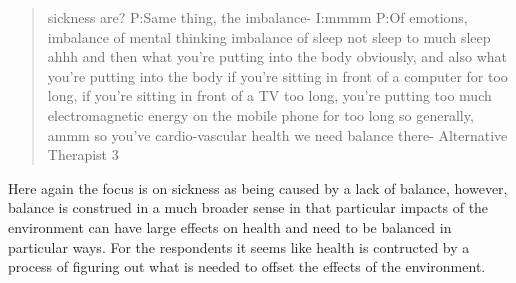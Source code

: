 \begin{quotation}
  sickness are?
P:Same thing, the imbalance-
I:mmmm
P:Of emotions, imbalance of mental thinking imbalance of sleep not sleep to much sleep ahhh and then what you're putting into the body obviously, and also what you're putting into the body if you're sitting in front of a computer for too long, if you're sitting in front of a TV too long, you're putting too much electromagnetic energy on the mobile phone for too long so generally, ammm so you've cardio-vascular health we need balance there-
Alternative Therapist 3
\end{quotation}

Here again the focus is on sickness as being caused by a lack of balance, however, balance is construed in a much broader sense in that particular impacts of the environment can have large effects on health and need to be balanced in particular ways. For the respondents it seems like health is contructed by a process of figuring out what is needed to offset the effects of the environment. 




